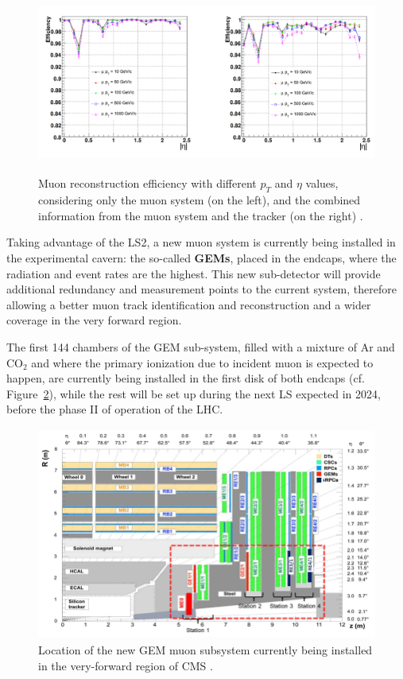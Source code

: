 \documentclass[a4paper, 10pt, openright]{report}
\begin{document}
\begin{figure}[htbp]
\begin{center}
\includegraphics[width=14cm, height=6cm]{figs/muonRecoEff.png}
\caption{Muon reconstruction efficiency with different $p_T$ and $\eta$ values, considering only the muon system (on the left), and the combined information from the muon system and the tracker (on the right) \cite{CMSDescription}.}
\label{fig:MuonRecoEff}
\end{center}
\end{figure}

Taking advantage of the \ac{LS}2, a new muon system is currently being installed in the experimental cavern: the so-called \textbf{\acfp{GEM}}, placed in the endcaps, where the radiation and event rates are the highest. This new sub-detector will provide additional redundancy and measurement points to the current system, therefore allowing a better muon track identification and reconstruction and a wider coverage in the very forward region. 

The first 144 chambers of the \ac{GEM} sub-system, filled with a mixture of Ar and CO$_2$ and where the primary ionization due to incident muon is expected to happen, are currently being installed in the first disk of both endcaps (cf. Figure~\ref{fig:CMSGEM}), while the rest will be set up during the next \ac{LS} expected in 2024, before the phase II of operation of the \ac{LHC}.

\begin{figure}[htbp]
\begin{center}
\includegraphics[width=12cm, height=7cm]{figs/CMSGEM.png}
\caption{Location of the new \ac{GEM} muon subsystem currently being installed in the very-forward region of \ac{CMS} \cite{CMSDescription}.}
\label{fig:CMSGEM}
\end{center}
\end{figure}
\end{document}
